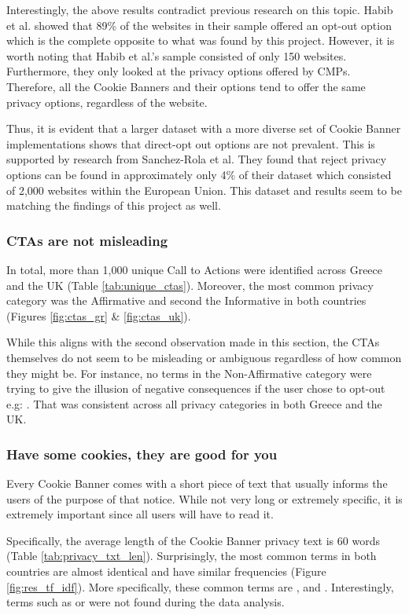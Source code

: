 \documentclass[../main.tex]{subfiles}
\begin{document}
Interestingly, the above results contradict previous research on this topic. Habib et al. \cite{habib2019empirical} showed that 89\% of the websites in their sample offered an opt-out option which is the complete opposite to what was found by this project. However, it is worth noting that Habib et al.’s sample consisted of only 150 websites. Furthermore, they only looked at the privacy options offered by CMPs. Therefore, all the Cookie Banners and their options tend to offer the same privacy options, regardless of the website. 

Thus, it is evident that a larger dataset with a more diverse set of Cookie Banner implementations shows that direct-opt out options are not prevalent. This is supported by research from Sanchez-Rola et al. \cite{sanchez2019can} They found that reject privacy options can be found in approximately only 4\% of their dataset which consisted of 2,000 websites within the European Union. This dataset and results seem to be matching the findings of this project as well. 

\subsubsection{CTAs are not misleading}
In total, more than 1,000 unique Call to Actions were identified across Greece and the UK (Table \ref{tab:unique_ctas}). Moreover, the most common privacy category was the Affirmative and second the Informative in both countries (Figures \ref{fig:ctas_gr} \& \ref{fig:ctas_uk}).

While this aligns with the second observation made in this section, the CTAs themselves do not seem to be misleading or ambiguous regardless of how common they might be. For instance, no terms in the Non-Affirmative category were trying to give the illusion of negative consequences if the user chose to opt-out e.g: . That was consistent across all privacy categories in both Greece and the UK. 

\subsubsection{Have some cookies, they are good for you}
Every Cookie Banner comes with a short piece of text that usually informs the users of the purpose of that notice. While not very long or extremely specific, it is extremely important since all users will have to read it. 

Specifically, the average length of the Cookie Banner privacy text is 60 words (Table \ref{tab:privacy_txt_len}). Surprisingly, the most common terms in both countries are almost identical and have similar frequencies (Figure \ref{fig:res_tf_idf}). More specifically, these common terms are ,  and . Interestingly, terms such as  or  were not found during the data analysis. 
\end{document}
